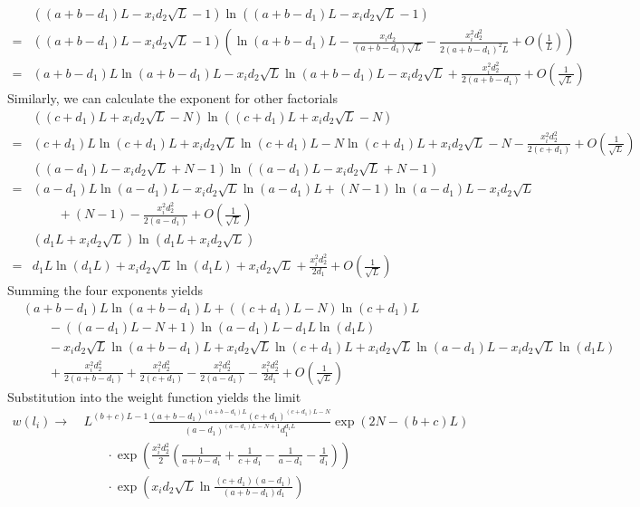 \documentclass[12pt]{article}
\begin{document}
\begin{align*}
	&\left((a+b-d_1)L-x_id_2\sqrt{L}-1\right) \ln{\left((a+b-d_1)L-x_id_2\sqrt{L}-1\right)}\\
	=& \left((a+b-d_1)L-x_id_2\sqrt{L}-1\right) 
	\left( \ln(a+b-d_1)L-\frac{x_id_2}{(a+b-d_1)\sqrt{L}}-\frac{x_i^2d_2^2}{2(a+b-d_1)^2L}+O(\frac{1}{L}) \right) \\
	=& (a+b-d_1)L\ln(a+b-d_1)L - x_id_2 \sqrt{L}\ln(a+b-d_1)L-x_id_2\sqrt{L} + \frac{x_i^2d_2^2}{2(a+b-d_1)} + O(\frac{1}{\sqrt{L}})
\end{align*}
Similarly, we can calculate the exponent for other factorials
\begin{align*}
	& \left( (c+d_1)L+x_id_2\sqrt{L}-N \right) \ln\left( (c+d_1)L+x_id_2\sqrt{L}-N \right)\\
	=& (c+d_1)L \ln(c+d_1)L+x_id_2\sqrt{L}\ln(c+d_1)L-N\ln(c+d_1)L+x_id_2\sqrt{L}-N-\frac{x_i^2d_2^2}{2(c+d_1)} + O(\frac{1}{\sqrt{L}})
\\
	& \left( (a-d_1)L-x_id_2\sqrt{L}+N-1 \right) \ln\left( (a-d_1)L-x_id_2\sqrt{L}+N-1 \right)\\
	=& (a-d_1)L \ln(a-d_1)L-x_id_2\sqrt{L}\ln(a-d_1)L+(N-1)\ln(a-d_1)L-x_id_2\sqrt{L}\\
	&\qquad +(N-1)-\frac{x_i^2d_2^2}{2(a-d_1)} + O(\frac{1}{\sqrt{L}})
\\
	& \left( d_1L+x_id_2\sqrt{L} \right)\ln\left( d_1L+x_id_2\sqrt{L} \right) \\
	=& d_1L\ln(d_1L)+x_id_2\sqrt{L}\ln(d_1L)+x_id_2\sqrt{L}+\frac{x_i^2d_2^2}{2d_1} + O(\frac{1}{\sqrt{L}})
\end{align*}
Summing the four exponents yields
\begin{align*}
	&(a+b-d_1)L\ln(a+b-d_1)L + ((c+d_1)L-N) \ln(c+d_1)L\\
	&\qquad- ((a-d_1)L-N+1)\ln(a-d_1)L - d_1L\ln(d_1L) \\
	&\qquad- x_id_2 \sqrt{L}\ln(a+b-d_1)L + x_id_2\sqrt{L}\ln(c+d_1)L + x_id_2\sqrt{L}\ln(a-d_1)L - x_id_2\sqrt{L}\ln(d_1L)\\
	&\qquad+ \frac{x_i^2d_2^2}{2(a+b-d_1)} +\frac{x_i^2d_2^2}{2(c+d_1)} -\frac{x_i^2d_2^2}{2(a-d_1)} -\frac{x_i^2d_2^2}{2d_1} + O(\frac{1}{\sqrt{L}})
\end{align*}
Substitution into the weight function yields the limit
\begin{align*}
	w(l_i) \to& \ L^{(b+c)L-1}
	\frac{(a+b-d_1)^{(a+b-d_1)L} (c+d_1)^{(c+d_1)L-N}}{(a-d_1)^{(a-d_1)L-N+1} d_1^{d_1L}} \exp\left(2N-(b+c)L\right)\\
	&\qquad\cdot
	\exp\left(\frac{x_i^2d_2^2}{2}(\frac{1}{a+b-d_1}+\frac{1}{c+d_1}-\frac{1}{a-d_1}-\frac{1}{d_1})\right)\\
	&\qquad\cdot
	\exp\left(x_id_2\sqrt{L} \ln\frac{(c+d_1)(a-d_1)}{(a+b-d_1)d_1}\right)
\end{align*}
\end{document}

